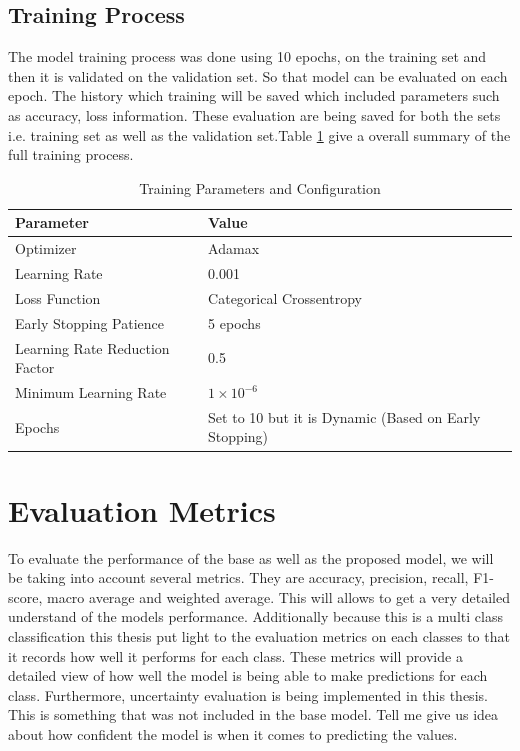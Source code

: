 \documentclass[12pt,onecolumn]{report}
\begin{document}
\subsection{Training Process}
The model training process was done using 10 epochs, on the training set and then it is validated on the validation set. So that model can be evaluated on each epoch. The history which training will be saved which included parameters such as accuracy, loss information. These evaluation are being saved for both the sets i.e. training set as well as the validation set.Table \ref{tab:training_parameters} give a overall summary of the full training process.

\begin{table}[h]
    \centering
    \caption{Training Parameters and Configuration}
    \label{tab:training_parameters}
    \begin{tabular}{|l|l|}
        \hline
        \textbf{Parameter} & \textbf{Value} \\
        \hline
        Optimizer          & Adamax \\
        Learning Rate      & 0.001 \\
        Loss Function      & Categorical Crossentropy \\
        Early Stopping Patience & 5 epochs \\
        Learning Rate Reduction Factor & 0.5 \\
        Minimum Learning Rate & \(1 \times 10^{-6}\) \\
        Epochs             & Set to 10 but it is Dynamic (Based on Early Stopping) \\
        \hline
    \end{tabular}
\end{table}

\section{Evaluation Metrics}

To evaluate the performance of the base as well as the proposed model, we will be taking into account several metrics. They are  accuracy, precision, recall, F1-score, macro average and weighted average. This will allows to get a very detailed understand of the models performance. Additionally because this is a multi class classification this thesis put light to the evaluation metrics on each classes to that it records how well it performs for each class. These metrics will provide a detailed view of how well the model is being able to make predictions for each class. Furthermore, uncertainty evaluation is being implemented in this thesis. This is something that was not included in the base model. Tell me give us idea about how confident the model is when it comes to predicting the values.
\end{document}
